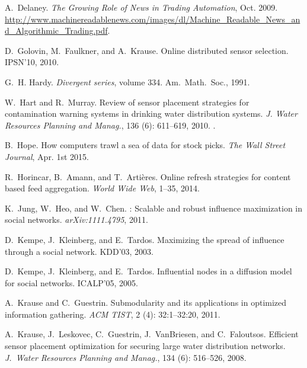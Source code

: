\begin{thebibliography}{41}
A.~Delaney.
\newblock \emph{The Growing Role of News in Trading Automation}, Oct. 2009.
\newblock
  \url{http://www.machinereadablenews.com/images/dl/Machine_Readable_News_and_Algorithmic_Trading.pdf}.

D.~Golovin, M.~Faulkner, and A.~Krause.
\newblock Online distributed sensor selection.
\newblock IPSN'10, 2010.

G.~H. Hardy.
\newblock \emph{Divergent series}, volume 334.
\newblock Am.~Math.~Soc., 1991.

W.~Hart and R.~Murray.
\newblock Review of sensor placement strategies for contamination warning
  systems in drinking water distribution systems.
\newblock \emph{J. Water Resources Planning and Manag.},
  136 (6): 611--619, 2010.
\newblock {}.

B.~Hope.
\newblock How computers trawl a sea of data for stock picks.
\newblock \emph{The Wall Street Journal}, Apr. 1st 2015.

R.~Horincar, B.~Amann, and T.~Arti{\`e}res.
\newblock Online refresh strategies for content based feed aggregation.
\newblock \emph{World Wide Web}, 1--35, 2014.

K.~Jung, W.~Heo, and W.~Chen.
: Scalable and robust influence maximization in social
  networks.
\newblock \emph{arXiv:1111.4795}, 2011.

D.~Kempe, J.~Kleinberg, and E.~Tardos.
\newblock Maximizing the spread of influence through a social network.
\newblock KDD'03, 2003.

D.~Kempe, J.~Kleinberg, and E.~Tardos.
\newblock Influential nodes in a diffusion model for social networks.
\newblock ICALP'05, 2005.

A.~Krause and C.~Guestrin.
\newblock Submodularity and its applications in optimized information
  gathering.
\newblock \emph{ACM TIST}, 2 (4):
  32:1--32:20, 2011.

A.~Krause, J.~Leskovec, C.~Guestrin, J.~VanBriesen, and C.~Faloutsos.
\newblock Efficient sensor placement optimization for securing large water
  distribution networks.
\newblock \emph{J.~Water Resources Planning and Manag.},
  134 (6): 516--526, 2008.


\end{thebibliography}
